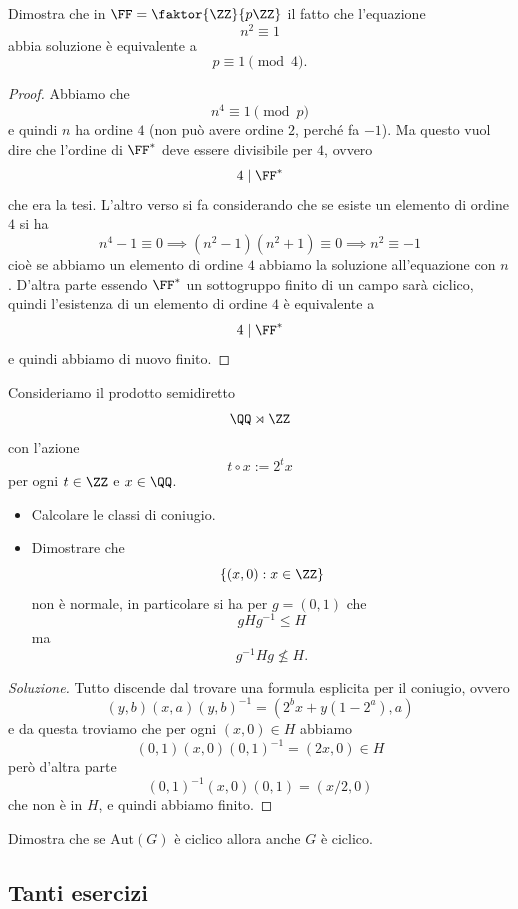 \documentclass[11pt]{scrartcl}
\begin{document}
	\begin{exercise}
		Dimostra che in $\FF=\faktor{\ZZ}{p\ZZ}$ il fatto che l'equazione 
		$$n^2\equiv 1$$
		abbia soluzione è equivalente a 
		$$p\equiv 1 \pmod{4}.$$
	\end{exercise}
	\begin{proof}
		Abbiamo che
		$$n^4\equiv 1 \pmod{p}$$
		e quindi $n$ ha ordine $4$ (non può avere ordine $2$, perché fa $-1$). Ma questo vuol dire che l'ordine di $\FF^*$ deve essere divisibile per $4$, ovvero
		$$4\mid \FF^*$$
		che era la tesi. L'altro verso si fa considerando che se esiste un elemento di ordine $4$ si ha
		$$n^4-1\equiv 0 \implies \left(n^2-1\right)\left(n^2+1\right)\equiv 0 \implies n^2\equiv -1$$
		cioè se abbiamo un elemento di ordine $4$ abbiamo la soluzione all'equazione con $n$. D'altra parte essendo $\FF^*$ un sottogruppo finito di un campo sarà ciclico, quindi l'esistenza di un elemento di ordine $4$ è equivalente a 
		$$4\mid \FF^{*}$$
		e quindi abbiamo di nuovo finito.
	\end{proof}
	\begin{exercise}
		Consideriamo il prodotto semidiretto 
		$$\QQ\rtimes \ZZ$$
		con l'azione 
		$$t\circ x := 2^t x$$
		per ogni $t\in \ZZ$ e $x\in \QQ$.
		\begin{itemize}
			\item Calcolare le classi di coniugio.
			\item Dimostrare che 
			$$\left\{\left(x,0\right):x\in\ZZ\right\}$$
			non è normale, in particolare si ha per $g=(0,1)$ che
			$$gHg^{-1}\le H$$
			ma
			$$g^{-1}Hg\not\le H.$$
		\end{itemize}
	\end{exercise}
	\begin{proof}[Soluzione]
		Tutto discende dal trovare una formula esplicita per il coniugio, ovvero
		$$(y,b)(x,a)(y,b)^{-1}=(2^bx+y(1-2^a),a)$$
		e da questa troviamo che per ogni $(x,0)\in H$ abbiamo
		$$(0,1)(x,0)(0,1)^{-1}=(2x,0)\in H$$
		però d'altra parte
		$$(0,1)^{-1}(x,0)(0,1)=(x/2,0)$$
		che non è in $H$, e quindi abbiamo finito.
	\end{proof}
	\begin{exercise}
		Dimostra che se $\text{Aut}(G)$ è ciclico allora anche $G$ è ciclico.
	\end{exercise}
	
	\subsection{Tanti esercizi}
	
\end{document}
